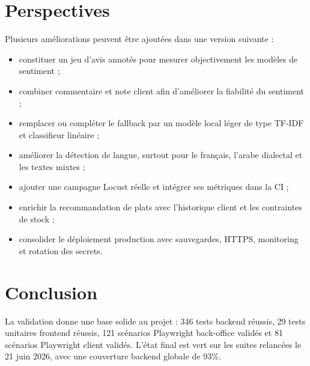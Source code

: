 \section{Perspectives}
Plusieurs améliorations peuvent être ajoutées dans une version suivante :

\begin{itemize}
  \item constituer un jeu d'avis annotés pour mesurer objectivement les modèles de sentiment ;
  \item combiner commentaire et note client afin d'améliorer la fiabilité du sentiment ;
  \item remplacer ou compléter le fallback par un modèle local léger de type TF-IDF et classifieur linéaire ;
  \item améliorer la détection de langue, surtout pour le français, l'arabe dialectal et les textes mixtes ;
  \item ajouter une campagne Locust réelle et intégrer ses métriques dans la CI ;
  \item enrichir la recommandation de plats avec l'historique client et les contraintes de stock ;
  \item consolider le déploiement production avec sauvegardes, HTTPS, monitoring et rotation des secrets.
\end{itemize}

\section*{Conclusion}
La validation donne une base solide au projet : 346 tests backend réussis, 29 tests unitaires frontend réussis, 121 scénarios Playwright back-office validés et 81 scénarios Playwright client validés. L'état final est vert sur les suites relancées le 21 juin 2026, avec une couverture backend globale de 93\%.
